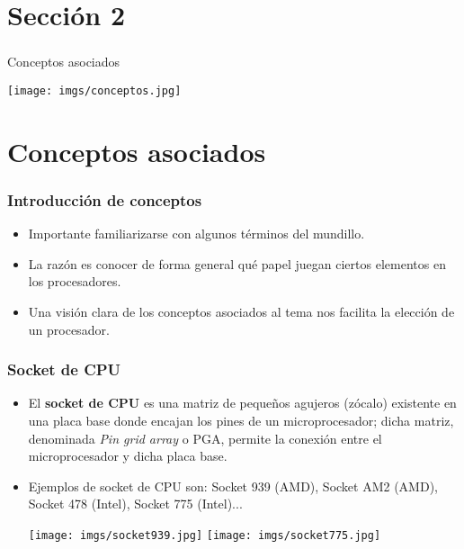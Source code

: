 \section*{Sección 2}
\frame
{
\frametitle{}
\begin{center}
\begin{huge}
\hspace*{1cm}Conceptos asociados\newline\newline
\end{huge}
\texttt{[image: imgs/conceptos.jpg]}
\end{center}
}

\section{Conceptos asociados}
\frame
{
\frametitle{Introducción de conceptos}
\begin{itemize}
 \item Importante familiarizarse con algunos términos del mundillo.
 \item La razón es conocer de forma general qué papel juegan ciertos elementos en los procesadores.
 \item Una visión clara de los conceptos asociados al tema nos facilita la elección de un procesador.
\end{itemize}
}

\frame
{
\frametitle{Socket de CPU}
\begin{itemize}
 \item El \textbf{socket de CPU} es una matriz de pequeños agujeros (zócalo) existente en una placa base donde encajan los pines de un microprocesador; dicha matriz, denominada \textit{Pin grid array} o PGA, permite la conexión entre el microprocesador y dicha placa base.
 \item Ejemplos de socket de CPU son: Socket 939 (AMD), Socket AM2 (AMD), Socket 478 (Intel), Socket 775 (Intel)...\vspace*{0.5cm}

\hspace*{3cm}
\texttt{[image: imgs/socket939.jpg]}
\hspace*{1cm}
\texttt{[image: imgs/socket775.jpg]}

\end{itemize}
}

